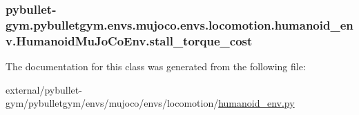 \subsubsection[{\texorpdfstring{stall\+\_\+torque\+\_\+cost}{stall_torque_cost}}]{\setlength{\rightskip}{0pt plus 5cm}pybullet-\/gym.\+pybulletgym.\+envs.\+mujoco.\+envs.\+locomotion.\+humanoid\+\_\+env.\+Humanoid\+Mu\+Jo\+Co\+Env.\+stall\+\_\+torque\+\_\+cost}\hypertarget{classpybullet-gym_1_1pybulletgym_1_1envs_1_1mujoco_1_1envs_1_1locomotion_1_1humanoid__env_1_1_humanoid_mu_jo_co_env_a908c4f0df91bbc9e30ea9343fc978177}{}\label{classpybullet-gym_1_1pybulletgym_1_1envs_1_1mujoco_1_1envs_1_1locomotion_1_1humanoid__env_1_1_humanoid_mu_jo_co_env_a908c4f0df91bbc9e30ea9343fc978177}


The documentation for this class was generated from the following file\+:\begin{DoxyCompactItemize}
\item 
external/pybullet-\/gym/pybulletgym/envs/mujoco/envs/locomotion/\hyperlink{mujoco_2envs_2locomotion_2humanoid__env_8py}{humanoid\+\_\+env.\+py}\end{DoxyCompactItemize}
